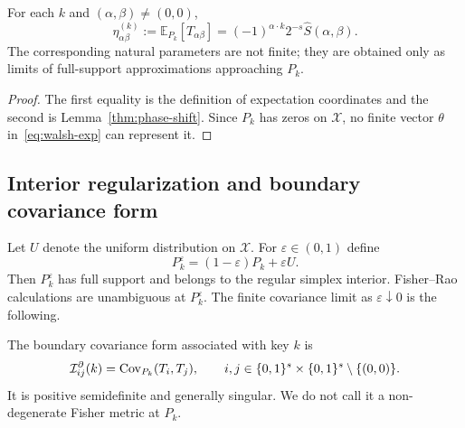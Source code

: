 \begin{proposition}\label{prop:eta-coords-boundary}
For each $k$ and $(\alpha,\beta)\neq(0,0)$,
\begin{equation}\label{eq:eta-params}
  \eta^{(k)}_{\alpha\beta}
  :=\mathbb E_{P_k}[T_{\alpha\beta}]
  =(-1)^{\alpha\cdot k}2^{-s}\widehat S(\alpha,\beta).
\end{equation}
The corresponding natural parameters are not finite; they are obtained only as
limits of full-support approximations approaching $P_k$.
\end{proposition}

\begin{proof}
The first equality is the definition of expectation coordinates and the second
is Lemma~\ref{thm:phase-shift}.  Since $P_k$ has zeros on $\mathcal X$, no
finite vector $\theta$ in~\eqref{eq:walsh-exp} can represent it.
\end{proof}

\subsection{Interior regularization and boundary covariance form}\label{subsec:fim}

Let $U$ denote the uniform distribution on $\mathcal X$.  For
$\varepsilon\in(0,1)$ define
\begin{equation}\label{eq:eps-reg}
  P_k^{\varepsilon}=(1-\varepsilon)P_k+\varepsilon U.
\end{equation}
Then $P_k^{\varepsilon}$ has full support and belongs to the regular simplex
interior.  Fisher--Rao calculations are unambiguous at $P_k^{\varepsilon}$.
The finite covariance limit as $\varepsilon\downarrow0$ is the following.

\begin{definition}\label{def:boundary-fisher}
The boundary covariance form associated with key $k$ is
\begin{equation}\label{eq:boundary-fisher}
  \mathcal I^{\partial}_{ij}(k)=\operatorname{Cov}_{P_k}(T_i,T_j),
  \qquad i,j\in\{0,1\}^{s}\times\{0,1\}^{s}\setminus\{(0,0)\}.
\end{equation}
It is positive semidefinite and generally singular.  We do not call it a
non-degenerate Fisher metric at $P_k$.
\end{definition}

